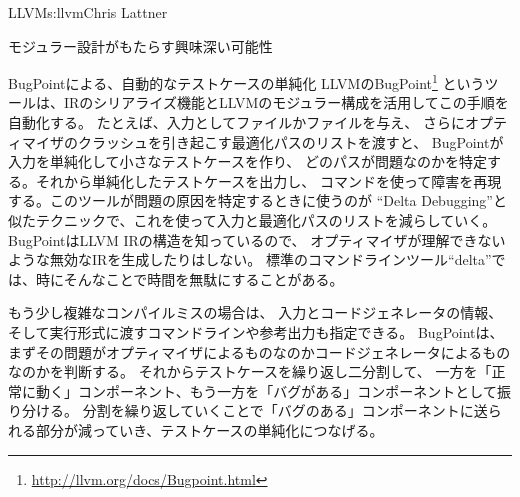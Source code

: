 \begin{aosachapter}{LLVM}{s:llvm}{Chris Lattner}
\begin{aosasect1}{モジュラー設計がもたらす興味深い可能性}
\begin{aosasect2}{BugPointによる、自動的なテストケースの単純化}
LLVMのBugPoint\footnote{\url{http://llvm.org/docs/Bugpoint.html}}
というツールは、IRのシリアライズ機能とLLVMのモジュラー構成を活用してこの手順を自動化する。
たとえば、入力としてファイルかファイルを与え、
さらにオプティマイザのクラッシュを引き起こす最適化パスのリストを渡すと、
BugPointが入力を単純化して小さなテストケースを作り、
どのパスが問題なのかを特定する。それから単純化したテストケースを出力し、
コマンドを使って障害を再現する。このツールが問題の原因を特定するときに使うのが
``Delta Debugging''と似たテクニックで、これを使って入力と最適化パスのリストを減らしていく。
BugPointはLLVM IRの構造を知っているので、
オプティマイザが理解できないような無効なIRを生成したりはしない。
標準のコマンドラインツール``delta''では、時にそんなことで時間を無駄にすることがある。

もう少し複雑なコンパイルミスの場合は、
入力とコードジェネレータの情報、そして実行形式に渡すコマンドラインや参考出力も指定できる。
BugPointは、まずその問題がオプティマイザによるものなのかコードジェネレータによるものなのかを判断する。
それからテストケースを繰り返し二分割して、
一方を「正常に動く」コンポーネント、もう一方を「バグがある」コンポーネントとして振り分ける。
分割を繰り返していくことで「バグのある」コンポーネントに送られる部分が減っていき、テストケースの単純化につなげる。


\end{aosasect2}
\end{aosasect1}
\end{aosachapter}
